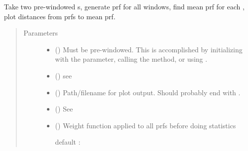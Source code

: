 \documentclass[letterpaper,10pt,openany,oneside,english]{sphinxmanual}
\begin{document}

\begin{fulllineitems}
\label{\detokenize{prfstats:prfstats.plot_dists_to_means}}
Take two pre-windowed s, generate prf for all windows, find
mean prf for each , plot distances from prfs to mean prf.
\begin{quote}\begin{description}
\item[{Parameters}] \leavevmode\begin{itemize}
\item {} 
 ({\hyperref[\detokenize{signals:signals.Trajectory}]{}}) \textendash{} Must be pre-windowed. This is accomplished by initializing with the
 parameter, calling the  method, or using
.

\item {} 
 ({\hyperref[\detokenize{signals:signals.Trajectory}]{}}) \textendash{} see 

\item {} 
 () \textendash{} Path/filename for plot output. Should probably end with .

\item {} 
 () \textendash{} See {\hyperref[\detokenize{phomology:phomology.build_filtration.build_filtration}]{}}

\item {} 
 (\sphinxstyleliteralemphasis{, }) \textendash{} 
Weight function applied to all prfs before doing statistics

default : 



\end{itemize}
\end{description}
\end{quote}
\end{fulllineitems}
\end{document}
